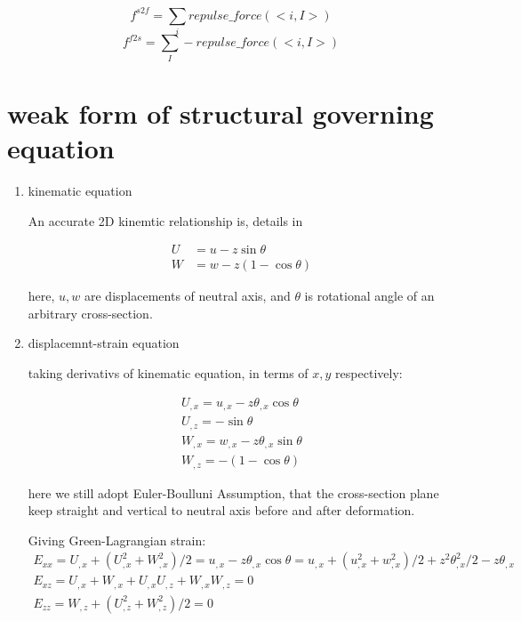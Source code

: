 \documentclass[11pt]{article}
\begin{document}
$$ f^{s2f} = \sum_i repulse\_force(<i,I>) $$
$$ f^{f2s} = \sum_I -repulse\_force(<i,I>) $$

\section{weak form of structural governing equation}

\begin{enumerate}

\item{kinematic equation}

An accurate 2D kinemtic relationship is, details in \cite[p.~215]{limingrui}

\begin{subequations}
 \begin{align}
	U &= u - z \sin \theta \\
	W &= w - z(1- \cos \theta)
  \end{align}
 \end{subequations}

here, $u, w$ are displacements of neutral axis, and $\theta$ is rotational angle of an arbitrary cross-section.

\item{displacemnt-strain equation}

taking derivativs of kinematic equation, in terms of $x,y$ respectively:

 \begin{subequations}
	\begin{align}
	U_{,x} = u_{,x} - z \theta_{,x} \cos \theta \\
	U_{,z} = - \sin \theta \\
	W_{,x} = w_{,x} - z \theta_{,x} \sin \theta \\
	W_{,z} = -(1- \cos \theta)
	\end{align}
\end{subequations}

here we still adopt Euler-Boulluni Assumption, that the cross-section plane keep straight and vertical to neutral axis before and after deformation.

Giving Green-Lagrangian strain:
 \begin{subequations}
	\begin{align}
	E_{xx} = U_{,x} + ( U_{,x}^2 + W_{,x}^2)/2 = u_{,x} - z \theta_{,x} \cos \theta = u_{,x} + ( u_{,x}^2 + w_{,x}^2)/2 + z^2 \theta_{,x}^2/2 - z \theta_{,x}  \\
	E_{xz} = U_{,x} + W_{,x} + U_{,x} U_{,z} + W_{,x} W_{,z} = 0 \\ 
	E_{zz} = W_{,z} + ( U_{,z}^2 + W_{,z}^2)/2 = 0
	\end{align}
\end{subequations}


\end{enumerate}
\end{document}
